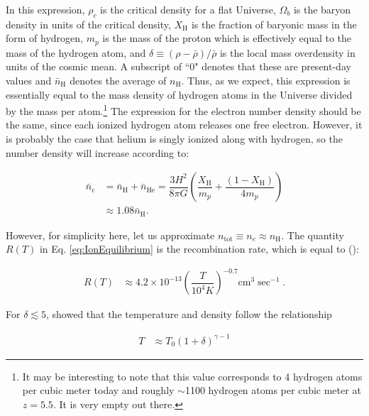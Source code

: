 In this expression, $\rho_c$ is the critical density for a flat Universe, $\Omega_{b}$ is the baryon density in units of the critical density, $X_{\text{H}}$ is the fraction of baryonic mass in the form of hydrogen, $m_{p}$ is the mass of the proton which is effectively equal to the mass of the hydrogen atom, and $\delta \equiv (\rho-\bar{\rho})/\bar{\rho}$ is the local mass overdensity in units of the cosmic mean. A subscript of ``0" denotes that these are present-day values and $\bar{n}_{\text{H}}$ denotes the average of $n_{\text{H}}$. Thus, as we expect, this expression is essentially equal to the mass density of hydrogen atoms in the Universe divided by the mass per atom.\footnote{It may be interesting to note that this value corresponds to 4 hydrogen atoms per cubic meter today and roughly $\sim$1100 hydrogen atoms per cubic meter at $z = 5.5$. It is very empty out there.}  The expression for the electron number density should be the same, since each ionized hydrogen atom releases one free electron. However, it is probably the case that helium is singly ionized along with hydrogen, so the number density will increase according to:

\begin{align}
\bar{n}_e &= \bar{n}_{\text{H}} + \bar{n}_{\text{He}} = \dfrac{3H^2}{8\pi G}\left( \dfrac{X_{\text{H}}}{m_{p}} + \dfrac{(1 - X_{\text{H}})}{4m_{p}} \right) \\
&\approx 1.08 \bar{n}_{\text{H}}. 
\end{align}

However, for simplicity here, let us approximate $n_{\text{tot}} \equiv n_{e} \approx n_{\text{H}}$. The quantity $R(T)$ in Eq. \ref{eq:IonEquilibrium} is the recombination rate, which is equal to (\citealt{Hui1997}):

\begin{align}
R(T) &\approx 4.2 \times 10^{-13}\left( \dfrac{T}{10^{4} K}\right)^{-0.7} \text{cm}^{3}\sec^{-1}. \label{eq:RecombinationRate}
\end{align}

For $\delta \lesssim 5$, \cite{Hui1997} showed that the temperature and density follow the relationship

\begin{align}
T &\approx T_{0}(1+\delta)^{\gamma - 1} \label{eq:Trelation}
\end{align}

